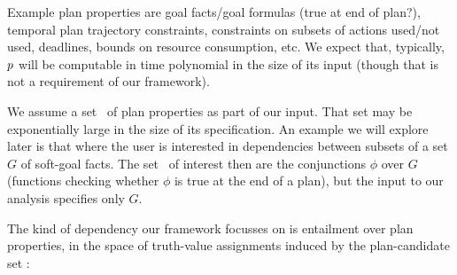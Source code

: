 Example plan properties are goal facts/goal formulas (true at end of
plan?), temporal plan trajectory constraints, constraints on subsets
of actions used/not used, deadlines, bounds on resource consumption,
etc. We expect that, typically, $p$ will be computable in time
polynomial in the size of its input (though that is not a requirement
of our framework).

We assume a set \props\ of plan properties as part of our input. That
set may be exponentially large in the size of its specification. An
example we will explore later is that where the user is interested in
dependencies between subsets of a set $G$ of soft-goal facts. The set
\props\ of interest then are the conjunctions $\phi$ over $G$
(functions checking whether $\phi$ is true at the end of a plan), but
the input to our analysis specifies only $G$.
%
%
%

The kind of dependency our framework focusses on is entailment over
plan properties, in the space of truth-value assignments induced by
the plan-candidate set \plans:

